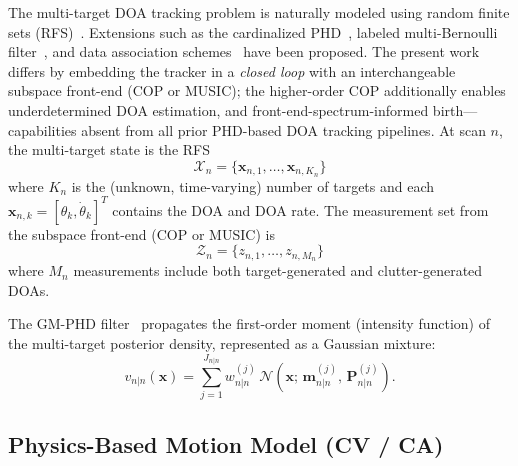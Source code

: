\documentclass[journal]{IEEEtran}
\newcommand{\mat}[1]{\mathbf{#1}}
\begin{document}
The multi-target DOA tracking problem is naturally modeled using random finite sets (RFS)~\cite{mahler2003phd,mahler2007statistical}. Extensions such as the cardinalized PHD~\cite{vo2007cphd}, labeled multi-Bernoulli filter~\cite{vo2014lmb}, and data association schemes~\cite{panta2009gmphd,georgescu2012phd_doa} have been proposed. The present work differs by embedding the tracker in a \emph{closed loop} with an interchangeable subspace front-end (COP or MUSIC); the higher-order COP additionally enables underdetermined DOA estimation, and front-end-spectrum-informed birth---capabilities absent from all prior PHD-based DOA tracking pipelines. At scan $n$, the multi-target state is the RFS
\begin{equation}
\mathcal{X}_n = \{\mat{x}_{n,1}, \ldots, \mat{x}_{n,K_n}\}
\end{equation}
where $K_n$ is the (unknown, time-varying) number of targets and each $\mat{x}_{n,k} = [\theta_k, \dot{\theta}_k]^T$ contains the DOA and DOA rate. The measurement set from the subspace front-end (COP or MUSIC) is
\begin{equation}
\mathcal{Z}_n = \{z_{n,1}, \ldots, z_{n,M_n}\}
\end{equation}
where $M_n$ measurements include both target-generated and clutter-generated DOAs.

The GM-PHD filter~\cite{vo2006gmphd} propagates the first-order moment (intensity function) of the multi-target posterior density, represented as a Gaussian mixture:
\begin{equation}
v_{n|n}(\mat{x}) = \sum_{j=1}^{J_{n|n}} w_{n|n}^{(j)}\,\mathcal{N}(\mat{x};\, \mat{m}_{n|n}^{(j)},\, \mat{P}_{n|n}^{(j)}).
\label{eq:phd_gm}
\end{equation}

\subsection{Physics-Based Motion Model (CV / CA)}
\end{document}
